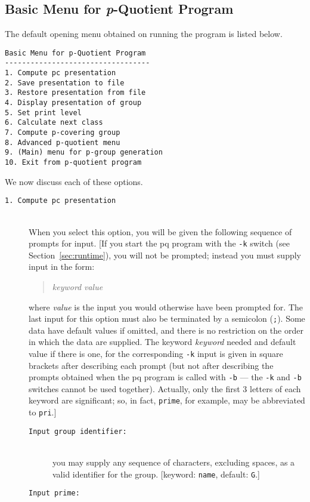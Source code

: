 \documentclass[12pt]{article}
\begin{document}
\subsection{Basic Menu for {\it p}-Quotient Program}\label{sec:basic-menu}
The default opening menu obtained on running the program is listed below.
\begin{verbatim}
Basic Menu for p-Quotient Program
----------------------------------
1. Compute pc presentation
2. Save presentation to file
3. Restore presentation from file
4. Display presentation of group
5. Set print level
6. Calculate next class
7. Compute p-covering group
8. Advanced p-quotient menu
9. (Main) menu for p-group generation
10. Exit from p-quotient program
\end{verbatim}
We now discuss each of these options.
\begin{description}
\item[\texttt{1.\ Compute pc presentation}]\ \\ 
 When you select this option, you will be given the following sequence
 of prompts for input. [If you start the pq program with the \texttt{-k}
 switch (see Section~\ref{sec:runtime}), you will not be prompted;
 instead you must supply input in the form:
 \begin{quote}
 \textit{keyword} \textit{value}
 \end{quote}
 where \textit{value} is the input you would otherwise have been prompted
 for. The last input for this option must also be terminated by a semicolon
 (\texttt{;}). Some data have default values if omitted, and there is no
 restriction on the order in which the data are supplied. The keyword
 \textit{keyword} needed and default value if there is one, for the
 corresponding \texttt{-k} input is given in square brackets after describing
 each prompt (but not after describing the prompts obtained when the pq
 program is called with \texttt{-b} --- the \texttt{-k} and \texttt{-b}
 switches cannot be used together). Actually, only the first 3 letters
 of each keyword are significant; so, in fact, \texttt{prime}, for example,
 may be abbreviated to \texttt{pri}.]
 \begin{description}
 \item[\texttt{Input group identifier:}]\ \\
  you may supply any sequence of characters, 
  excluding spaces, as a valid identifier for the group.
  [keyword: \texttt{name}, default: \texttt{G}.]
 \item[\texttt{Input prime:}]\ \\

\end{description}
\end{description}
\end{document}
